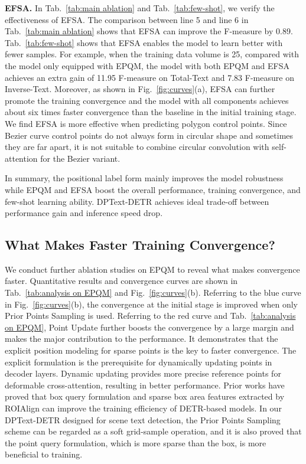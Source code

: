 \documentclass[letterpaper]{article} \usepackage{aaai23}  \usepackage{times}  \usepackage{helvet}  \usepackage{courier}  \usepackage[hyphens]{url}  \usepackage{graphicx} \urlstyle{rm}
\begin{document}
\textbf{EFSA.} In Tab.~\ref{tab:main ablation} and Tab.~\ref{tab:few-shot}, we verify the effectiveness of EFSA. The comparison between line 5 and line 6 in Tab.~\ref{tab:main ablation} shows that EFSA can improve the F-measure by 0.89.
Tab.~\ref{tab:few-shot} shows that EFSA enables the model to learn better with fewer samples. For example, when the training data volume is 25, compared with the model only equipped with EPQM, the model with both EPQM and EFSA achieves an extra gain of 11.95 F-measure on Total-Text and 7.83 F-measure on Inverse-Text. Moreover, as shown in Fig.~\ref{fig:curves}(a), EFSA can further promote the training convergence and the model with all components achieves about six times faster convergence than the baseline in the initial training stage. We find EFSA is more effective when predicting polygon control points. Since Bezier curve control points do not always form in circular shape and sometimes they are far apart, it is not suitable to combine circular convolution with self-attention for the Bezier variant.

In summary, the positional label form mainly improves the model robustness while EPQM and EFSA boost the overall performance, training convergence, and few-shot learning ability. DPText-DETR achieves ideal trade-off between performance gain and inference speed drop. 

\subsection{What Makes Faster Training Convergence?}
We conduct further ablation studies on EPQM to reveal what makes convergence faster. Quantitative results and convergence curves are shown in Tab.~\ref{tab:analysis on EPQM} and Fig.~\ref{fig:curves}(b). Referring to the blue curve in Fig.~\ref{fig:curves}(b), the convergence at the initial stage is improved when only Prior Points Sampling is used. Referring to the red curve and Tab.~\ref{tab:analysis on EPQM}, Point Update further boosts the convergence by a large margin and makes the major contribution to the performance. It demonstrates that the explicit position modeling for sparse points is the key to faster convergence. The explicit formulation is the prerequisite for dynamically updating points in decoder layers. Dynamic updating provides more precise reference points for deformable cross-attention, resulting in better performance. Prior works \cite{liu2022dabdetr,wang2022towards} have proved that box query formulation and sparse box area features extracted by ROIAlign can improve the training efficiency of DETR-based models. In our DPText-DETR designed for scene text detection, the Prior Points Sampling scheme can be regarded as a soft grid-sample operation, and it is also proved that the point query formulation, which is more sparse than the box, is more beneficial to training. 
\end{document}
